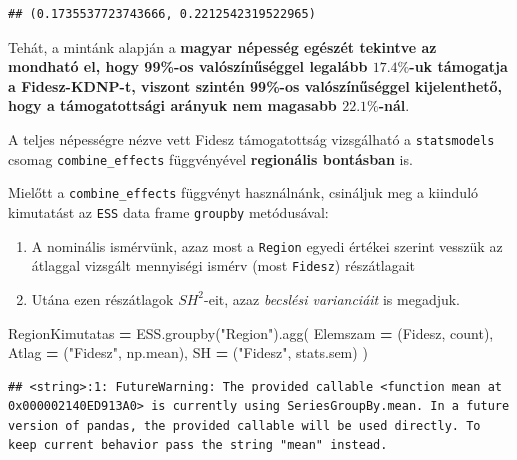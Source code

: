 \documentclass[
]{book}
\newenvironment{Shaded}{\begin{snugshade}}{\end{snugshade}}
\newcommand{\NormalTok}[1]{#1}
\newcommand{\OperatorTok}[1]{\textcolor[rgb]{0.81,0.36,0.00}{\textbf{#1}}}
\newcommand{\StringTok}[1]{\textcolor[rgb]{0.31,0.60,0.02}{#1}}
\providecommand{\tightlist}{%
  \setlength{\itemsep}{0pt}\setlength{\parskip}{0pt}}
\begin{document}
\begin{verbatim}
## (0.1735537723743666, 0.2212542319522965)
\end{verbatim}

Tehát, a mintánk alapján a \textbf{magyar népesség egészét tekintve az mondható el, hogy 99\%-os valószínűséggel legalább \(17.4\%\)-uk támogatja a Fidesz-KDNP-t, viszont szintén 99\%-os valószínűséggel kijelenthető, hogy a támogatottsági arányuk nem magasabb \(22.1\%\)-nál}.

A teljes népességre nézve vett Fidesz támogatottság vizsgálható a \texttt{statsmodels} csomag \texttt{combine\_effects} függvényével \textbf{regionális bontásban} is.

Mielőtt a \texttt{combine\_effects} függvényt használnánk, csináljuk meg a kiinduló kimutatást az \texttt{ESS} data frame \texttt{groupby} metódusával:

\begin{enumerate}
\def\labelenumi{\arabic{enumi}.}
\tightlist
\item
  A nominális ismérvünk, azaz most a \texttt{Region} egyedi értékei szerint vesszük az átlaggal vizsgált mennyiségi ismérv (most \texttt{Fidesz}) részátlagait
\item
  Utána ezen részátlagok \(SH^2\)-eit, azaz \emph{becslési varianciáit} is megadjuk.
\end{enumerate}

\begin{Shaded}
\begin{Highlighting}[]
\NormalTok{RegionKimutatas }\OperatorTok{=}\NormalTok{ ESS.groupby(}\StringTok{"Region"}\NormalTok{).agg(}
\NormalTok{  Elemszam }\OperatorTok{=}\NormalTok{ (}\StringTok{\textquotesingle{}Fidesz\textquotesingle{}}\NormalTok{, }\StringTok{\textquotesingle{}count\textquotesingle{}}\NormalTok{),}
\NormalTok{  Atlag }\OperatorTok{=}\NormalTok{ (}\StringTok{"Fidesz"}\NormalTok{, np.mean),}
\NormalTok{  SH }\OperatorTok{=}\NormalTok{ (}\StringTok{"Fidesz"}\NormalTok{, stats.sem)}
\NormalTok{)}
\end{Highlighting}
\end{Shaded}

\begin{verbatim}
## <string>:1: FutureWarning: The provided callable <function mean at 0x000002140ED913A0> is currently using SeriesGroupBy.mean. In a future version of pandas, the provided callable will be used directly. To keep current behavior pass the string "mean" instead.
\end{verbatim}
\end{document}

